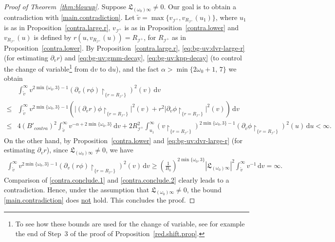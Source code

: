\documentclass[10pt, reqno]{amsart}
\theoremstyle{definition}
\theoremstyle{remark}
\theoremstyle{conjecture}
\numberwithin{equation}{section}
\newcommand{\ud}{\mathrm{d}}
\newcommand{\rd}{\partial}
\newcommand{\0}{\emptyset}
\newcommand{\alp}{\alpha}
\newcommand{\omg}{\omega}
\newcommand{\calI}{\mathcal I}
\newcommand{\f}{\frac}
\begin{document}
\begin{proof}[Proof of Theorem~\ref{thm:blowup}]
Suppose $\mathfrak L_{(\omg_0)\infty}\neq 0$. Our goal is to obtain a contradiction with \eqref{main.contradiction}. Let $\tilde{v}=\max\{v_{\calI^+}, v_{R_{\calI^+}}(u_1)\}$, where $u_1$ is as in Proposition~\ref{contra.large.r}, $v_{\calI^+}$ is as in Proposition~\ref{contra.lower} and $v_{R_{\calI^+}}(u)$ is defined by $r(u, v_{R_{\calI^+}}(u))=R_{\calI^+}$, for $R_{\calI^+}$ as in Proposition~\ref{contra.lower}. By Proposition~\ref{contra.large.r}, \eqref{eq:bg-uv:dvr-large-r} (for estimating $\rd_v r$) and \eqref{eq:bg-uv:gmm-decay}, \eqref{eq:bg-uv:kpp-decay} (to control the change of variable\footnote{To see how these bounds are used for the change of variable, see for example the end of Step~3 of the proof of Proposition~\ref{red.shift.prop}.} from $\ud v$ to $\ud u$), and the fact $\alp>\min\{2\omg_0+1,\, 7\}$ we obtain
\begin{equation}\label{contra.conclude.1}
\begin{split}
&\int_{\tilde{v}}^\infty v^{2\min\{\omg_0,3\}-1} \left(\rd_v (r\phi)\restriction_{\{r=R_{\calI^+}\}}\right)^2(v)\, \ud v\\
\leq &\int_{\tilde{v}}^\infty v^{2\min\{\omg_0,3\}-1} \left(|(\rd_v r)\phi\restriction_{\{r=R_{\calI^+}\}}|^2(v)+r^2|\rd_v\phi\restriction_{\{r=R_{\calI^+}\}}|^2(v)\right)\, \ud v \\
\leq & 4(B'_{contra})^2\int_{\tilde{v}}^\infty v^{-\alp + 2\min\{\omg_0,3\}}\, \ud v + 2 R_{\calI^+}^2 \int_{u_1}^\infty \left(v\restriction_{\{r=R_{\calI^+}\}}\right)^{2\min\{\omg_0,3\}-1} \left(\rd_v\phi\restriction_{\{r=R_{\calI^+}\}}\right)^2(u)\, \ud u<\infty.
\end{split}
\end{equation}
On the other hand, by Proposition~\ref{contra.lower} and \eqref{eq:bg-uv:dvr-large-r} (for estimating $\rd_v r$), since $\mathfrak L_{(\omg_0)\infty}\neq 0$, we have
\begin{equation}\label{contra.conclude.2}
\begin{split}
\int_{\tilde{v}}^\infty v^{2\min\{\omg_0,3\}-1} \left(\rd_v (r\phi)\restriction_{\{r=R_{\calI^+}\}} \right)^2(v)\, \ud v\geq \left(\f{1}{B_0}\right)^{2\min\{\omg_0,3\}} \left|\mathfrak L_{(\omg_0)\infty}\right|^2 \int_{\tilde{v}}^\infty v^{-1}\, \ud v =\infty.
\end{split}
\end{equation}
Comparison of \eqref{contra.conclude.1} and \eqref{contra.conclude.2} clearly leads to a contradiction. Hence, under the assumption that $\mathfrak L_{(\omg_0)\infty}\neq 0$, the bound \eqref{main.contradiction} does \underline{not} hold. This concludes the proof. \qedhere
\end{proof}
%
%
%
%
%
\end{document}
